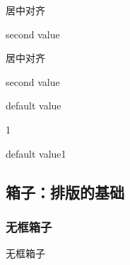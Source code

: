 \documentclass[twoside]{ctexart}
\begin{document}
            \newenvironment{newenv2}[2][default value]
            {\newcommand{\firstvalue}{#1}
            \newcommand{\secondvalue}{#2}
            \begin{center}\firstvalue\par}
            {\par\secondvalue\end{center}}

            \begin{newenv2}[first value]{second value}
                居中对齐
            \end{newenv2}

            \begin{newenv2}{second value}
                居中对齐
            \end{newenv2}


            \newcommand{\newcd}[1][default value]{#1}
            \newcd 

            \newcd[1]

            \newcd{1}

    \subsection{箱子：排版的基础}
        \subsubsection{无框箱子}
            \mbox{无框箱子}
\end{document}
